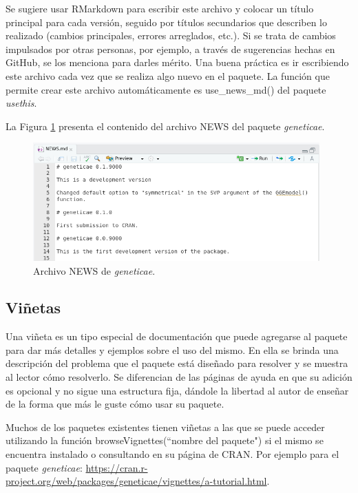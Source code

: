 Se sugiere usar RMarkdown para escribir este archivo y colocar un título principal para cada versión, seguido por títulos secundarios que describen lo realizado (cambios principales, errores arreglados, etc.). Si se trata de cambios impulsados por otras personas, por ejemplo, a través de sugerencias hechas en GitHub, se los menciona para darles mérito. Una buena práctica es ir escribiendo este archivo cada vez que se realiza algo nuevo en el paquete. La función que permite crear este archivo automáticamente es \textcolor{fandango}{use\_news\_md()} del paquete \emph{usethis}. 

La Figura \ref{fig:fig39} presenta el contenido del archivo NEWS del paquete \emph{geneticae}.

\begin{figure}[h]
	\begin{center}
		\includegraphics[width=11cm]{./Graficos/News.png}	
	\end{center}
	\caption{Archivo NEWS de \emph{geneticae}.}
	\label{fig:fig39}
\end{figure}


\subsection{Viñetas}

Una viñeta es un tipo especial de documentación que puede agregarse al paquete para dar más detalles y ejemplos sobre el uso del mismo. En ella se brinda una descripción del problema que el paquete está diseñado para resolver y se muestra al lector cómo resolverlo. Se diferencian de las páginas de ayuda en que su adición es opcional y no sigue una estructura fija, dándole la libertad al autor de enseñar de la forma que más le guste cómo usar su paquete. 


Muchos de los paquetes existentes tienen viñetas a las que se puede acceder utilizando la función \textcolor{fandango}{browseVignettes(``nombre del paquete")} si el mismo se encuentra instalado o consultando en su página de CRAN. Por ejemplo para el paquete \emph{geneticae}: \url{https://cran.r-project.org/web/packages/geneticae/vignettes/a-tutorial.html}.


